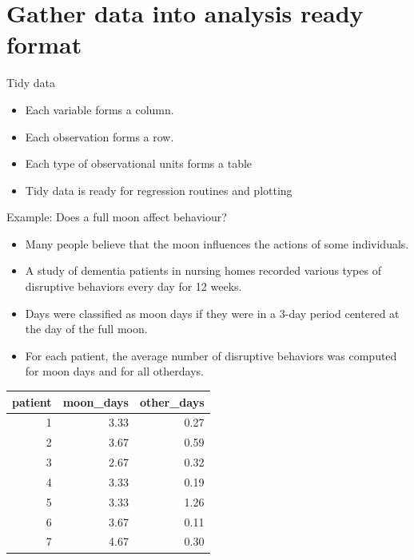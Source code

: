 \documentclass{beamer}\usepackage[]{graphicx}\usepackage[]{color}
\newenvironment{knitrout}{}{} %
\begin{document}
\section{Gather data into analysis ready format}

\begin{frame}{Tidy data}
	
\begin{itemize}
	\setlength\itemsep{.51em}
	\item Each variable forms a column.
	\item Each observation forms a row.
	\item Each type of observational units forms a table
	\item Tidy data is ready for regression routines and plotting
\end{itemize}


\end{frame}



\begin{frame}[fragile]{Example: Does a full moon affect behaviour?}
	
	\small
	\begin{itemize}
		\item Many people believe that the moon influences the actions of some individuals. 
		\item A study of dementia patients in nursing homes recorded various types of disruptive behaviors every day for 12 weeks. 
		\item Days were classified as moon days if they were in a 3-day period centered at the day of the full moon. 
		\item For each patient, the average number of disruptive behaviors was computed for moon days and for all otherdays. 
	\end{itemize}
	
\begin{knitrout}\footnotesize
{}\color{fgcolor}
\begin{tabular}{r|r|r}
\hline
patient & moon\_days & other\_days\\
\hline
1 & 3.33 & 0.27\\
\hline
2 & 3.67 & 0.59\\
\hline
3 & 2.67 & 0.32\\
\hline
4 & 3.33 & 0.19\\
\hline
5 & 3.33 & 1.26\\
\hline
6 & 3.67 & 0.11\\
\hline
7 & 4.67 & 0.30\\
\hline
\end{tabular}


\end{knitrout}
	
	
	
\end{frame}
\end{document}
